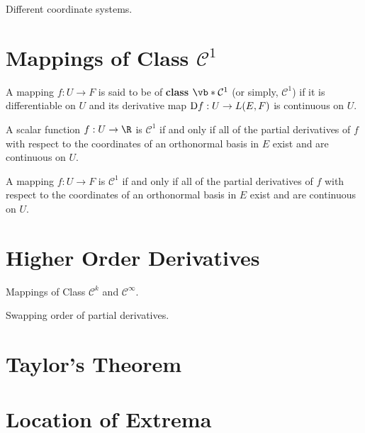 Different coordinate systems.
\section{Mappings of Class \( \mathcal{C}^1\)}
\label{sec:C1}
\begin{definition}
  A mapping \( f:U\to F \) is said to be of \textbf{class \(\vb*{\mathcal{C}^1}\)} (or simply, \( \mathcal{C}^1 \)) if it is differentiable on \( U \) and its derivative map \( \text{D} f:U\to L(E,F) \) is continuous on \( U \).
\end{definition}

\begin{theorem}
  A scalar function \( f:U\to \R \) is \( \mathcal{C}^1 \) if and only if all of the partial derivatives of \( f \) with respect to the coordinates of an orthonormal basis in \( E \) exist and are continuous on \( U \).
\end{theorem}

\begin{theorem}
  A mapping \( f:U\to F \) is \( \mathcal{C}^1 \) if and only if all of the partial derivatives of \( f \) with respect to the coordinates of an orthonormal basis in \( E \) exist and are continuous on \( U \).
\end{theorem}
\section{Higher Order Derivatives}
Mappings of Class \( \mathcal{C}^k \) and \( \mathcal{C}^\infty \).

Swapping order of partial derivatives.
\section{Taylor's Theorem}
\section{Location of Extrema}


